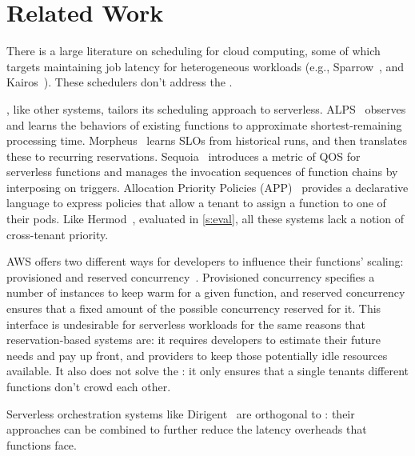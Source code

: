 \section{Related Work}


There is a large literature on scheduling for cloud computing, some of
which targets maintaining job latency for heterogeneous workloads
(e.g., Sparrow~\cite{sparrow}, and Kairos~\cite{kairos}). These
schedulers don't address the \problem.

\Sys{}, like other systems, tailors its scheduling approach to
serverless.  ALPS~\cite{alps} observes and learns the behaviors of
existing functions to approximate shortest-remaining processing time.
Morpheus~\cite{morpheus} learns SLOs from historical runs, and then
translates these to recurring reservations.  Sequoia~\cite{sequoia}
introduces a metric of QOS for serverless functions and manages the
invocation sequences of function chains by interposing on
triggers. Allocation Priority Policies (APP)~\cite{app-paper} provides
a declarative language to express policies that allow a tenant to
assign a function to one of their pods.  Like Hermod~\cite{hermod},
evaluated in \autoref{s:eval}, all these systems lack a notion of
cross-tenant priority.


AWS offers two different ways for developers to influence their functions'
scaling: provisioned and reserved concurrency~\cite{aws-scaling}. Provisioned
concurrency specifies a number of instances to keep warm for a given function,
and reserved concurrency ensures that a fixed amount of the possible concurrency
reserved for it. This interface is undesirable for serverless workloads for the same
reasons that reservation-based systems are: it requires developers to estimate
their future needs and pay up front, and providers to keep those potentially
idle resources available. It also does not solve the \problem{}: it only ensures
that a single tenants different functions don't crowd each other.

Serverless orchestration systems like Dirigent~\cite{dirigent} are orthogonal to
\sys{}: their approaches can be combined to further reduce the latency overheads
that functions face.

